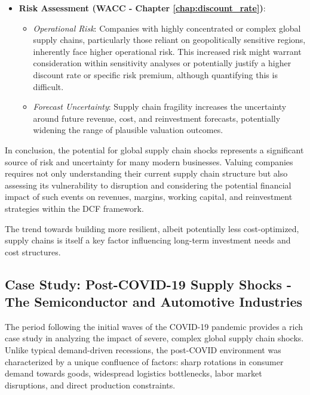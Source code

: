 \begin{itemize}
    \item \textbf{Risk Assessment (WACC - Chapter \ref{chap:discount_rate})}:
          \begin{itemize}
              \item \textit{Operational Risk}: Companies with highly concentrated or complex global supply chains, particularly those reliant on geopolitically sensitive regions, inherently face higher operational risk. This increased risk might warrant consideration within sensitivity analyses or potentially justify a higher discount rate or specific risk premium, although quantifying this is difficult.
              \item \textit{Forecast Uncertainty}: Supply chain fragility increases the uncertainty around future revenue, cost, and reinvestment forecasts, potentially widening the range of plausible valuation outcomes.
          \end{itemize}
\end{itemize}

In conclusion, the potential for global supply chain shocks represents a significant source of risk and uncertainty for many modern businesses. Valuing companies requires not only understanding their current supply chain structure but also assessing its vulnerability to disruption and considering the potential financial impact of such events on revenues, margins, working capital, and reinvestment strategies within the DCF framework.

The trend towards building more resilient, albeit potentially less \newline  cost-optimized, supply chains is itself a key factor influencing long-term investment needs and cost structures.

\subsection{Case Study: Post-COVID-19 Supply Shocks - The Semiconductor and Automotive Industries} \label{subsec:case_study_post_covid}

The period following the initial waves of the COVID-19 pandemic provides a rich case study in analyzing the impact of severe, complex global supply chain shocks. Unlike typical demand-driven recessions, the post-COVID environment was characterized by a unique confluence of factors: sharp rotations in consumer demand towards goods, widespread logistics bottlenecks, labor market disruptions, and direct production constraints. 

